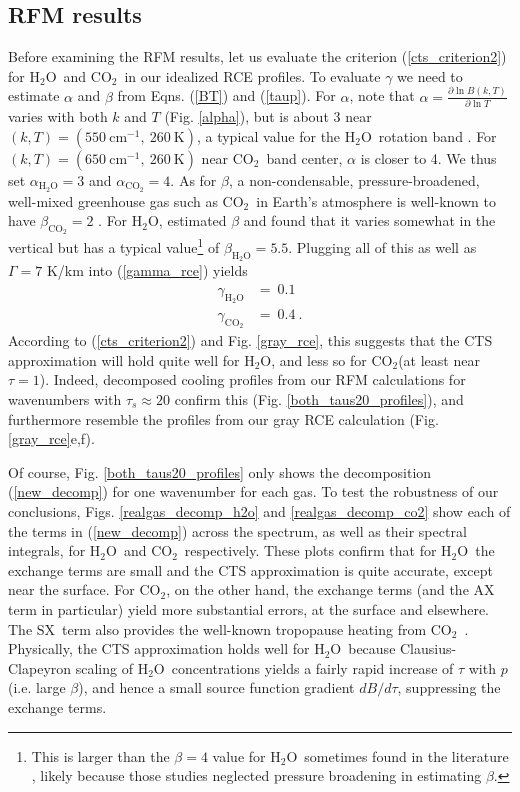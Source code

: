 \documentclass{ametsoc}
\newcommand{\beqn}{\begin{equation}}
\newcommand{\eeqn}{\end{equation}}
\newcommand{\eqnref}[1]{(\ref{#1})}
\newcommand{\Kelvin}{\ensuremath{\mathrm{K}}}
\newcommand{\cminverse}{\ensuremath{\mathrm{cm^{-1}}}}
\newcommand{\partialder}[2]{\ensuremath{\frac{\partial #1}{\partial #2}}}
\newcommand{\cotwo}{\ensuremath{\mathrm{CO_2}}}
\newcommand{\htwo}{\ensuremath{\mathrm{H_2O}}}
\newcommand{\taus}{\ensuremath{\tau_s}}
\newcommand{\SX}{\ensuremath{\mathrm{SX}}}
\begin{document}
\subsection{RFM results} \label{sec_real_rce}
Before examining the RFM results, let us evaluate the criterion \eqnref{cts_criterion2} for \htwo\ and \cotwo\ in our idealized RCE profiles. To evaluate $\gamma$ we need to estimate $\alpha$ and $\beta$ from Eqns. \eqnref{BT} and \eqnref{taup}. For $\alpha$, note that $\alpha = \partialder{ \ln B(k,T)}{\ln T}$ varies with both $k$ and $T$ (Fig. \ref{alpha}), but is about 3 near $(k,T)=(550\  \cminverse,\ 260\ \Kelvin)$, a typical value for the \htwo\ rotation band \citep[][]{jeevanjee2019a}. For $(k,T)=(650\  \cminverse,\ 260\  \Kelvin)$ near \cotwo\ band center, $\alpha$ is closer to 4.   We thus set $\alpha_{\htwo}=3 $ and $\alpha_{\cotwo}=4$.  As for $\beta$, a non-condensable, pressure-broadened, well-mixed greenhouse gas such as \cotwo\ in Earth's atmosphere is well-known to have $\beta_{\cotwo} = 2$ \citep{pierrehumbert2010}. For \htwo, \cite{jeevanjee2019a} estimated $\beta$ and found that it varies somewhat in the vertical but has a typical value\footnote{This is larger than the $\beta=4$ value for \htwo\ sometimes found in the literature \citep[e.g.][]{frierson2006}, likely because those studies neglected pressure broadening in estimating $\beta$.} of $\beta_{\htwo} = 5.5$. Plugging all of this as well as $\Gamma=7$ K/km into \eqnref{gamma_rce} yields
	\beqn
		\begin{split}
			\gamma_{\htwo}     & =  \  0.1        \\
			\gamma_{\cotwo}   & =  \ 0.4  \ .   		
		\end{split}
	\label{gamma_vals}
	\eeqn
According to \eqnref{cts_criterion2} and Fig. \ref{gray_rce}, this suggests that the CTS approximation will hold quite well for \htwo, and less so for \cotwo (at least near $\tau=1$). Indeed,  decomposed cooling profiles from our RFM calculations for wavenumbers with $\taus\approx20$  confirm this (Fig. \ref{both_taus20_profiles}), and furthermore resemble the profiles from our gray RCE calculation (Fig. \ref{gray_rce}e,f).

Of course, Fig. \ref{both_taus20_profiles} only shows the decomposition \eqnref{new_decomp} for one wavenumber for each gas. To test the robustness of our conclusions, Figs. \ref{realgas_decomp_h2o} and \ref{realgas_decomp_co2} show each of the terms in \eqnref{new_decomp} across the spectrum, as well as their spectral integrals, for \htwo\ and \cotwo\ respectively. These plots confirm that for \htwo\ the exchange terms are small and the CTS approximation is quite accurate, except near the surface. For \cotwo, on the other hand, the exchange terms (and the AX term in particular) yield more substantial errors, at the surface and elsewhere. The \SX\ term also provides the well-known tropopause heating from \cotwo\ \citep[e.g.][]{thuburn2002,zhu1992}. Physically, the CTS approximation holds well for \htwo\ because Clausius-Clapeyron scaling of \htwo\ concentrations yields a fairly rapid increase of $\tau$ with $p$ (i.e. large $\beta$), and hence a small source function gradient $dB/d\tau$, suppressing the exchange terms. 
\end{document}
